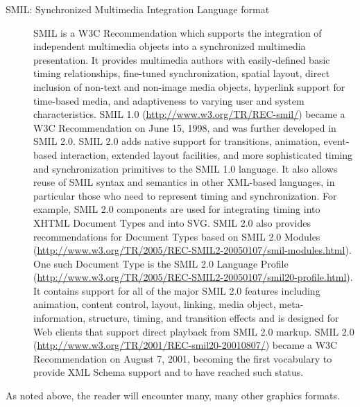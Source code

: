 \begin{description}
\item[{SMIL: Synchronized Multimedia Integration Language format}]SMIL is a W3C Recommendation which supports the integration of independent multimedia objects into a synchronized multimedia presentation. It provides multimedia authors with easily-defined basic timing relationships, fine-tuned synchronization, spatial layout, direct inclusion of non-text and non-image media objects, hyperlink support for time-based media, and adaptiveness to varying user and system characteristics. SMIL 1.0 (\url{http://www.w3.org/TR/REC-smil/}) became a W3C Recommendation on June 15, 1998, and was further developed in SMIL 2.0. SMIL 2.0 adds native support for transitions, animation, event-based interaction, extended layout facilities, and more sophisticated timing and synchronization primitives to the SMIL 1.0 language. It also allows reuse of SMIL syntax and semantics in other XML-based languages, in particular those who need to represent timing and synchronization. For example, SMIL 2.0 components are used for integrating timing into XHTML Document Types and into SVG. SMIL 2.0 also provides recommendations for Document Types based on SMIL 2.0 Modules (\url{http://www.w3.org/TR/2005/REC-SMIL2-20050107/smil-modules.html}). One such Document Type is the SMIL 2.0 Language Profile (\url{http://www.w3.org/TR/2005/REC-SMIL2-20050107/smil20-profile.html}). It contains support for all of the major SMIL 2.0 features including animation, content control, layout, linking, media object, meta-information, structure, timing, and transition effects and is designed for Web clients that support direct playback from SMIL 2.0 markup. SMIL 2.0 (\url{http://www.w3.org/TR/2001/REC-smil20-20010807/}) became a W3C Recommendation on August 7, 2001, becoming the first vocabulary to provide XML Schema support and to have reached such status.
\end{description} \par
As noted above, the reader will encounter many, many other graphics formats. 
